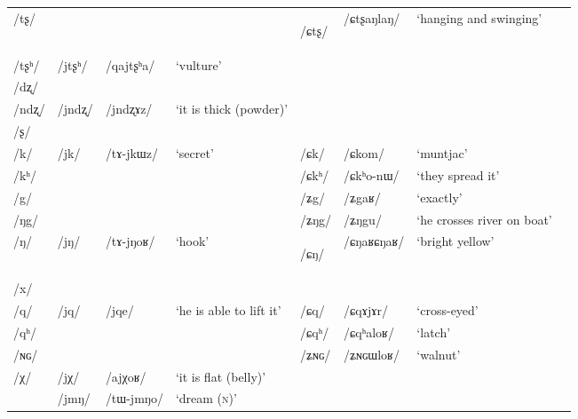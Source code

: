 \documentclass[12pt]{article}
\newcommand{\ipa}[1]{\mbox{\phon/#1/}}
\newcommand{\deux}[1]{\ipa{#1}\addtocounter{2clusters}{1}}
\newcommand{\trois}[1]{\ipa{#1}\addtocounter{3clusters}{1}}
\newcommand{\idph}[1]{\cellcolor{gray}\textbf{#1}}
\newcommand{\resetcounters}[2]{
\newcounter{#1}
\newcounter{#2}
 \setcounter{#1}{\value{2clusters}}
  \setcounter{#2}{\value{3clusters}}
 \setcounter{2clusters}{0}
  \setcounter{3clusters}{0}
}
\begin{document}
\begin{landscape}
\begin{longtable}{llllllll}
\ipa{tʂ} & & & & \deux{ɕtʂ} \idph{} & \ipa{ɕtʂaŋlaŋ} & `hanging and swinging' & \\
\ipa{tʂʰ} & \deux{jtʂʰ} & \ipa{qajtʂʰa} & `vulture' & & & & \\
\ipa{dʐ} & & & & & & & \\
\ipa{ndʐ} & \deux{jndʐ} & \ipa{jndʐɤz} & `it is thick (powder)' & & & & \\
\ipa{ʂ} & & & & & & & \\
\ipa{k} & \deux{jk} & \ipa{tɤ-jkɯz} & `secret' & \deux{ɕk} & \ipa{ɕkom} & `muntjac' & \\
\ipa{kʰ} & & & & \deux{ɕkʰ} & \ipa{ɕkʰo-nɯ} & `they spread it' & \\
\ipa{g} & & & & \deux{ʑg} & \ipa{ʑgaʁ} & `exactly' & \\
\ipa{ŋg} & & & & \deux{ʑŋg} & \ipa{ʑŋgu} & `he crosses river on boat' & \\
\ipa{ŋ} & \deux{jŋ} & \ipa{tɤ-jŋoʁ} & `hook' & \deux{ɕŋ} \idph{} & \ipa{ɕŋaʁɕŋaʁ} & `bright yellow' & \\
\ipa{x} & & & & & & & \\
\ipa{q} & \deux{jq} & \ipa{jqe} & `he is able to lift it' & \deux{ɕq} & \ipa{ɕqɤjɤr} & `cross-eyed' & \\
\ipa{qʰ} & & & & \deux{ɕqʰ} & \ipa{ɕqʰaloʁ} & `latch' & \\
\ipa{ɴɢ} & & & & \deux{ʑɴɢ} & \ipa{ʑɴɢɯloʁ} & `walnut' & \\
\ipa{χ} & \deux{jχ} & \ipa{ajχoʁ} & `it is flat (belly)' & & & & \\
\midrule        
 &\trois{jmŋ} & \ipa{tɯ-jmŋo} & `dream (\textsc{n})' \\  
 \bottomrule
\end{longtable}
\end{landscape}
   \resetcounters{2jcC}{3jcC} %
   
\end{document}
